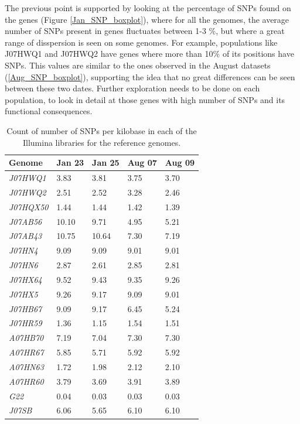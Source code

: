 The previous point is supported by looking at the percentage of SNPs found on the genes (Figure \ref{Jan_SNP_boxplot}), where for all the genomes, the average number of SNPs present in genes fluctuates between 1-3 \%, but where a great range of disspersion is seen on some genomes. For example, populations like J07HWQ1 and J07HWQ2 have genes where more than 10\% of its positions have SNPs. This values are similar to the ones observed in the August datasets (\ref{Aug_SNP_boxplot}), supporting the idea that no great differences can be seen between these two dates. Further exploration needs to be done on each population, to look in detail at those genes with high number of SNPs and its functional consequences.


\begin{table}[ht]
  \caption{Count of number of SNPs per kilobase in each of the Illumina libraries for the reference genomes.}
  \begin{tabularx}{\textwidth}{L{2.2cm}R{2cm}R{3cm}R{3.2cm}R{2cm}}
  \hline
    \textbf{Genome} & \textbf{Jan 23} & \textbf{Jan 25} & \textbf{Aug 07} & \textbf{Aug 09} \\
    \hline
     \textit{J07HWQ1} & 3.83 & 3.81 & 3.75 & 3.70 \\
     \textit{J07HWQ2} & 2.51 & 2.52 & 3.28 & 2.46 \\
     \textit{J07HQX50} & 1.44 & 1.44 & 1.42 & 1.39 \\
     \textit{J07AB56} & 10.10 & 9.71 & 4.95 & 5.21 \\
     \textit{J07AB43} & 10.75 & 10.64 & 7.30 & 7.19 \\
     \textit{J07HN4} & 9.09 & 9.09 & 9.01 & 9.01 \\
     \textit{J07HN6} & 2.87 & 2.61 & 2.85 & 2.81 \\
     \textit{J07HX64} & 9.52 & 9.43 & 9.35 & 9.26 \\
     \textit{J07HX5} & 9.26 & 9.17 & 9.09 & 9.01 \\
     \textit{J07HB67} & 9.09 & 9.17 & 6.45 & 5.24 \\
     \textit{J07HR59} & 1.36 & 1.15 & 1.54 & 1.51 \\
     \textit{A07HB70} & 7.19 & 7.04 & 7.30 & 7.30 \\
     \textit{A07HR67} & 5.85 & 5.71 & 5.92 & 5.92 \\
     \textit{A07HN63} & 1.72 & 1.98 & 2.12 & 2.10 \\
     \textit{A07HR60} & 3.79 & 3.69 & 3.91 & 3.89 \\
     \textit{G22} & 0.04 & 0.03 & 0.03 & 0.03 \\
     \textit{J07SB} & 6.06 & 5.65 & 6.10 & 6.10 \\     
  \end{tabularx}
  \label{SNPS_KB}
\end{table}

